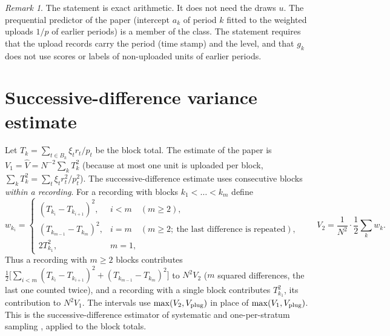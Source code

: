 \documentclass[11pt]{article}
\theoremstyle{remark}
\newtheorem{remark}{Remark}
\newcommand{\hV}{\hat V}
\begin{document}
\begin{remark}
The statement is exact arithmetic. It does not need the draws $u$. The prequential predictor of the paper (intercept $a_k$ of period $k$ fitted to the weighted uploads $1/p$ of earlier periods) is a member of the class. The statement requires that the upload records carry the period (time stamp) and the level, and that $g_k$ does not use scores or labels of non-uploaded units of earlier periods.
\end{remark}

\section{Successive-difference variance estimate}\label{sec:v2}
Let $T_k=\sum_{t\in B_k}\xi_tr_t/p_t$ be the block total. The estimate of the paper is $V_1=\hV=N^{-2}\sum_kT_k^2$ (because at most one unit is uploaded per block, $\sum_kT_k^2=\sum_t\xi_tr_t^2/p_t^2$). The successive-difference estimate uses consecutive blocks \emph{within a recording}. For a recording with blocks $k_1<\dots<k_m$ define
\[
w_{k_i}=\begin{cases}(T_{k_i}-T_{k_{i+1}})^2,&i<m\quad(m\ge2),\\ (T_{k_{m-1}}-T_{k_m})^2,&i=m\quad(m\ge2;\ \text{the last difference is repeated}),\\ 2T_{k_1}^2,&m=1,\end{cases}
\qquad
V_2=\frac1{N^2}\cdot\frac12\sum_kw_k .
\]
Thus a recording with $m\ge2$ blocks contributes $\tfrac12\big[\sum_{i<m}(T_{k_i}-T_{k_{i+1}})^2+(T_{k_{m-1}}-T_{k_m})^2\big]$ to $N^2V_2$ ($m$ squared differences, the last one counted twice), and a recording with a single block contributes $T_{k_1}^2$, its contribution to $N^2V_1$. The intervals use $\max(V_2,V_{\rm plug})$ in place of $\max(V_1,V_{\rm plug})$. This is the successive-difference estimator of systematic and one-per-stratum sampling \cite{wolter2007}, applied to the block totals.
\end{document}
